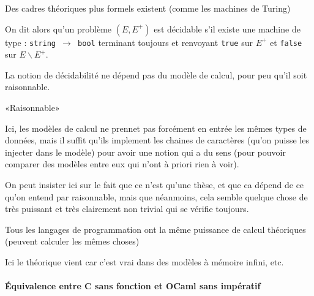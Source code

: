 \begin{rem}
	Des cadres théoriques plus formels existent (comme les machines de Turing)
\end{rem}

\begin{definition}[décidable]
	On dit alors qu'un problème $(E, E^+)$ est décidable s'il existe une machine de type : \texttt{string $\to$ bool} terminant toujours et renvoyant \texttt{true} sur $E^+$ et \texttt{false} sur $E \backslash E^+$.
\end{definition}

\begin{principe}
	La notion de décidabilité ne dépend pas du modèle de calcul, pour peu qu'il soit raisonnable.
\end{principe}

\begin{rem}
	«Raisonnable»
\end{rem}

\begin{com}
Ici, les modèles de calcul ne prennet pas forcément en entrée les mêmes types de données, mais il suffit qu'ils implement les chaines de caractères (qu'on puisse les injecter dans le modèle) pour avoir une notion qui a du sens (pour pouvoir comparer des modèles entre eux qui n'ont à priori rien à voir).
\end{com}

\begin{com}
	On peut insister ici sur le fait que ce n'est qu'une thèse, et que ca dépend de ce qu'on entend par raisonnable, mais que néanmoins, cela semble quelque chose de très puissant et très clairement non trivial qui se vérifie toujours.
\end{com}

\begin{idee}
	Tous les langages de programmation ont la même puissance de calcul théoriques (peuvent calculer les mêmes choses)
\end{idee}

\begin{com}
	Ici le théorique vient car c'est vrai dans des modèles à mémoire infini, etc.
\end{com}

\paragraph{Équivalence entre C sans fonction et OCaml sans impératif}

